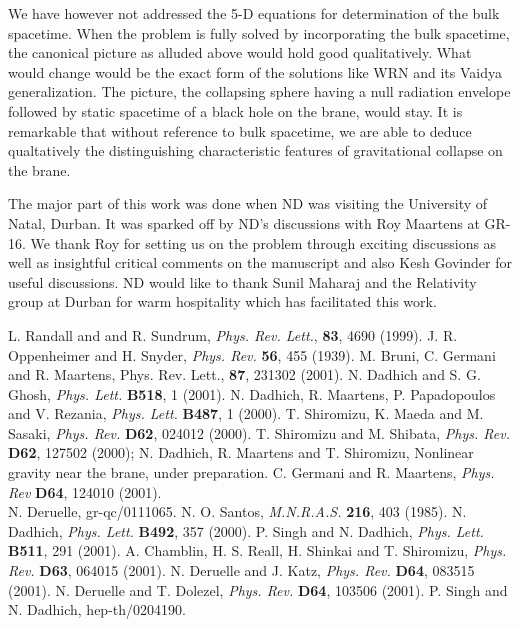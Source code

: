 \documentclass[a4paper,twocolumn,showpacs,preprintnumbers,amsmath,amssymb]{revtex4}
\begin{document}
We have however not addressed the 5-D equations for determination of  
the bulk spacetime. When the problem is fully solved by incorporating the 
bulk spacetime, the canonical picture as alluded above would hold good 
qualitatively. What would change would be the exact form of the solutions like 
WRN and its Vaidya generalization. The picture, the collapsing sphere having 
a null radiation envelope followed by static spacetime of a black hole on the 
brane, would stay. It is remarkable that without reference to bulk spacetime, 
we are able to deduce qualtatively the distinguishing characteristic features 
of gravitational collapse on the brane.


\begin{acknowledgments}

The major part of this work was done when ND was visiting the 
University of Natal, Durban. It was sparked off by ND's 
discussions with Roy Maartens at GR-16.
We thank Roy for setting us on the problem through exciting 
discussions as well as insightful critical comments on the manuscript and 
also Kesh Govinder for useful discussions. ND would like to thank Sunil 
Maharaj and the Relativity group at Durban for warm hospitality which has 
facilitated this work.

\end{acknowledgments}

\begin{thebibliography}{99}
L. Randall and and R. Sundrum, {\em Phys. Rev. Lett.}, {\bf 83}, 4690 
(1999). 
J. R. Oppenheimer and H. Snyder, {\em Phys. Rev.} {\bf 56}, 455 (1939).
M. Bruni, C. Germani and R. Maartens, {Phys. Rev. Lett.}, {\bf 87}, 231302 (2001).
N. Dadhich and S. G. Ghosh,  {\em Phys. Lett.} {\bf B518}, 1 (2001).
N. Dadhich, R. Maartens, P. Papadopoulos and V. Rezania, {\em Phys. Lett.} 
{\bf B487}, 1 (2000).
T. Shiromizu, K. Maeda and M. Sasaki, {\em Phys. Rev.} {\bf D62}, 024012 
(2000).
T. Shiromizu and M. Shibata,  {\em Phys. Rev.} {\bf D62}, 127502 (2000);
N. Dadhich, R. Maartens and T. Shiromizu, Nonlinear gravity near the brane,
 under preparation.
C. Germani and R. Maartens, {\em Phys. Rev} {\bf D64}, 124010 (2001).\\
N. Deruelle, gr-qc/0111065.
N. O. Santos, {\em M.N.R.A.S.}  {\bf 216}, 403 (1985).
N. Dadhich,  {\em Phys. Lett.} {\bf B492}, 357 (2000).
P. Singh and N. Dadhich, {\em Phys. Lett.} {\bf B511}, 291 (2001).
A. Chamblin, H. S. Reall, H. Shinkai and T. Shiromizu, {\em Phys. Rev.} 
{\bf D63}, 064015 (2001).
N. Deruelle and J. Katz, {\em Phys. Rev.} {\bf D64}, 083515 (2001).
N. Deruelle and T. Dolezel, {\em Phys. Rev.} {\bf D64}, 103506 (2001).
P. Singh and N. Dadhich, hep-th/0204190.
\end{thebibliography}
\end{document}
